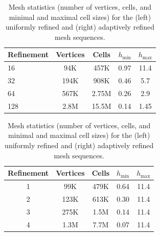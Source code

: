 \begin{table}%
  \label{chp6:meshstat}
  \centering
  \begin{minipage}{.45\textwidth}%
    \begin{tabular}{l|cccc}
      Refinement & Vertices & Cells  & $h_{\min}$ & $h_{\max}$ \\ \hline
      16 & 94K & 457K & 0.97 & 11.4 \\  
      32 & 194K & 908K &  0.46 & 5.7 \\  
      64 & 567K &  2.75M & 0.26 & 2.9 \\
      128 &  2.8M & 15.5M &  0.14 & 1.45
    \end{tabular}
    \label{tab:uniref}
  \end{minipage}%
  \hspace{2em}
  \begin{minipage}{.45\textwidth}%
    \begin{tabular}{c|cccc}
	    Refinement & Vertices & Cells & $h_{\min}$ & $h_{\max}$ \\ \hline
	     1 & 99K &  479K &  0.64 &  11.4 \\
	     2 & 123K& 613K & 0.30 &  11.4 \\
	     3 & 275K &  1.5M  &  0.14 & 11.4 \\
	     4 & 1.3M &  7.7M  & 0.07 &  11.4 \\
    \end{tabular}
    \label{tab:localref}
  \end{minipage}%
  \caption{Mesh statistics (number of vertices, cells, and minimal and
    maximal cell sizes) for the (left) uniformly refined and
    (right) adaptively refined mesh sequences.}
\end{table}
